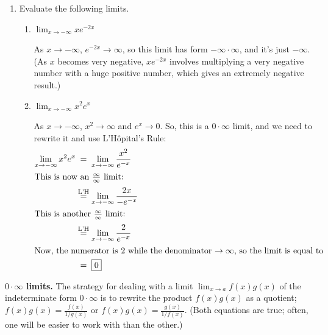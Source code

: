 \documentclass[main]{subfiles}
\begin{document}
\begin{enumerate}
\item 


  Evaluate the following limits.  
  \begin{enumerate}
  \item
    \begin{problem}[\vfill]
      $\displaystyle \lim_{x \to-\infty} x e^{-2x}$
    \end{problem}

    \begin{solution}
      As $x \to -\infty$, $e^{-2x} \to \infty$, so this limit has form
      $-\infty \cdot \infty$, and it's just $\boxed{-\infty}$.  (As $x$
      becomes very negative, $x e^{-2x}$ involves multiplying a very
      negative number with a huge positive number, which gives an
      extremely negative result.)
    \end{solution}

  \item
    \begin{problem}[\vfill]
      $\displaystyle \lim_{x \to -\infty} x^2 e^{x}$
    \end{problem}

    \begin{solution}
      As $x \to -\infty$, $x^2 \to \infty$ and $e^x \to 0$.  So, this is
      a $0 \cdot \infty$ limit, and we need to rewrite it and use
      L'H\^opital's Rule:
      \begin{align*}
        \lim_{x \to -\infty} x^2 e^x &\nolheq \lim_{x \to -\infty}
        \frac{x^2}{e^{-x}} \\
        \shortintertext{This is now an $\frac{\infty}{\infty}$ limit:}
        & \lheq \lim_{x \to -\infty} \frac{2x}{-e^{-x}} \\
        \shortintertext{This is another $\frac{\infty}{\infty}$ limit:}
        & \lheq \lim_{x \to - \infty} \frac{2}{e^{-x}} \\
        \intertext{Now, the numerator is 2 while the denominator $\to
          \infty$, so the limit is equal to}
        & \nolheq \boxed{0}
      \end{align*}
    \end{solution}

  \end{enumerate}

\end{enumerate}

  \begin{framed}
    \textbf{$0 \cdot \infty$ limits.}  The strategy for dealing
    with a limit $\displaystyle \lim_{x \to a} f(x) g(x)$ of the
    indeterminate form $0 \cdot \infty$ is to rewrite the product $f(x)
    g(x)$ as a quotient; $f(x) g(x) = \frac{f(x)}{1 / g(x)}$ or $f(x)
    g(x) = \frac{g(x)}{1 / f(x)}$.  (Both equations are true; often, one
    will be easier to work with than the other.)
  \end{framed}
\end{document}
